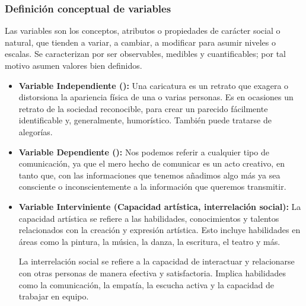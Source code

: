 \documentclass[12pt,a4paper]{article}
\begin{document}
\subsubsection{Definición conceptual de variables}

Las variables son los conceptos, atributos o propiedades de carácter social o natural, que tienden a variar, a cambiar, a modificar para asumir niveles o escalas. Se caracterizan por ser observables, medibles y cuantificables; por tal motivo asumen valores bien definidos.

\begin{itemize}
  \item \textbf{Variable Independiente (\variablei):} Una caricatura es un retrato que exagera o distorsiona la apariencia física de una o varias personas. Es en ocasiones un retrato de la sociedad reconocible, para crear un parecido fácilmente identificable y, generalmente, humorístico. También puede tratarse de alegorías.%

  \item \textbf{Variable Dependiente (\variabled):} Nos podemos referir a cualquier tipo de comunicación, ya que el mero hecho de comunicar es un acto creativo, en tanto que, con las informaciones que tenemos añadimos algo más ya sea consciente o inconscientemente a la información que queremos transmitir.%

  \item  \textbf{Variable Interviniente (Capacidad artística, interrelación social):} La capacidad artística se refiere a las habilidades, conocimientos y talentos relacionados con la creación y expresión artística. Esto incluye habilidades en áreas como la pintura, la música, la danza, la escritura, el teatro y más.
  
  La interrelación social se refiere a la capacidad de interactuar y relacionarse con otras personas de manera efectiva y satisfactoria. Implica habilidades como la comunicación, la empatía, la escucha activa y la capacidad de trabajar en equipo.
  

\end{itemize}
\end{document}
